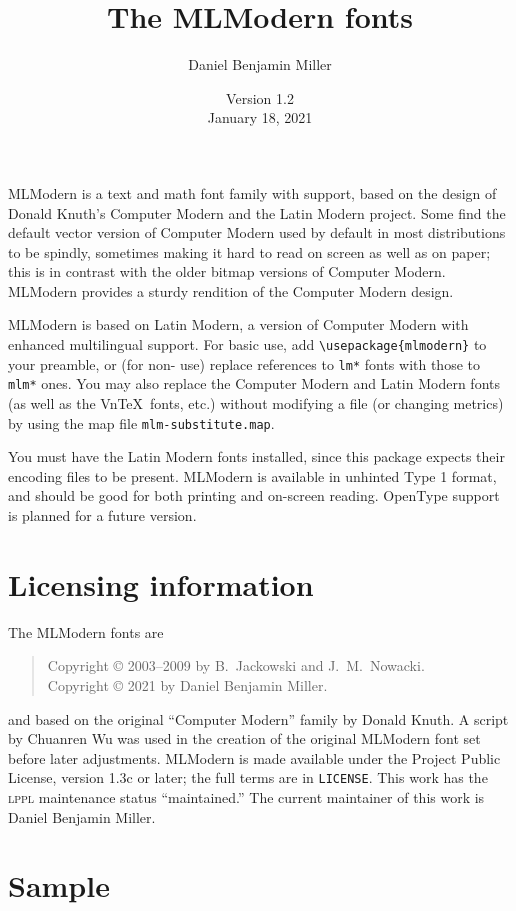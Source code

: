 \documentclass[12pt,letterpaper]{article}
\title{The MLModern fonts}
\author{Daniel Benjamin Miller}
\date{Version 1.2\\January 18, 2021}
\begin{document}
\maketitle
MLModern is a text and math font family with  support, based on the design of Donald Knuth's Computer Modern and the Latin Modern project. Some find the default vector version of Computer Modern used by default in most  distributions to be spindly, sometimes making it hard to read on screen as well as on paper; this is in contrast with the older bitmap versions of Computer Modern. MLModern provides a sturdy rendition of the Computer Modern design.

MLModern is based on Latin Modern, a version of Computer Modern with enhanced multilingual support. For basic use, add \texttt{\textbackslash usepackage\{mlmodern\}} to your preamble, or (for non- use) replace references to \texttt{lm*} fonts with those to \texttt{mlm*} ones. You may also replace the Computer Modern and Latin Modern fonts (as well as the Vn\TeX\ fonts, etc.) without modifying a  file (or changing metrics) by using the map file \texttt{mlm-substitute.map}.

You must have the Latin Modern fonts installed, since this package expects their encoding files to be present. MLModern is available in unhinted Type 1 format, and should be good for both printing and on-screen reading. OpenType support is planned for a future version.

\section*{Licensing information}

The MLModern fonts are
\begin{quote}
Copyright © 2003--2009 by B.\ Jackowski and J.\ M.\ Nowacki.\\
Copyright © 2021 by Daniel Benjamin Miller.
\end{quote}
and based on the original ``Computer Modern'' family by Donald Knuth. A script by Chuanren Wu was used in the creation of the original MLModern font set before later adjustments. MLModern is made available under the  Project Public License, version 1.3c or later; the full terms are in \texttt{LICENSE}. This work has the \textsc{lppl} maintenance status ``maintained.'' The current maintainer of this work is Daniel Benjamin Miller.

\section*{Sample}
\end{document}
